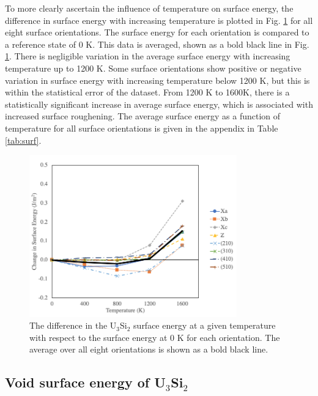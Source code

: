 \documentclass[review]{elsarticle}
\begin{document}
To more clearly ascertain the influence of temperature on surface energy, the difference in surface energy with increasing temperature is plotted in Fig. \ref{fig:deltasurf} for all eight surface orientations. The surface energy for each orientation is compared to a reference state of 0 K. This data is averaged, shown as a bold black line in Fig. \ref{fig:deltasurf}. There is negligible variation in the average surface energy with increasing temperature up to 1200 K. Some surface orientations show positive or negative variation in surface energy with increasing temperature below 1200 K, but this is within the statistical error of the dataset. From 1200 K to 1600K, there is a statistically significant increase in average surface energy, which is associated with increased surface roughening. The average surface energy as a function of temperature for all surface orientations is given in the appendix in Table \ref{tab:surf}. 

\begin{figure}[h]
 \centering
 \includegraphics[width=0.8\textwidth]{deltasurfvsT.png} 
 \caption{The difference in the U$_{3}$Si$_{2}$ surface energy at a given temperature with respect to the surface energy at 0 K for each orientation. The average over all eight orientations is shown as a bold black line. }
 \label{fig:deltasurf}
\end{figure}



\FloatBarrier

\subsection{Void surface energy of U$_{3}$Si$_{2}$}
\end{document}
